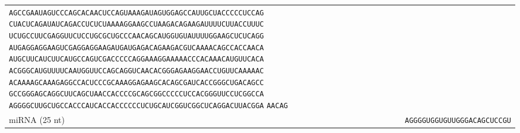 \begin{table}[ht]
\begin{tabular}{@{}p{2.6cm}l@{}}
  \texttt{AGCCGAAUAGUCCCAGCACAACUCCAGUAAAGAUAGUGGAGCCAUUGCUACCCCCUCCAG}\newline
  \texttt{CUACUCAGAUAUCAGACCUCUCUAAAAGGAAGCCUAAGACAGAAGAUUUUCUUACCUUUC}\newline
  \texttt{UCUGCCUUCGAGGUUCUCCUGCGCUGCCCAACAGCAUGGUGUAUUUUGGAAGCUCUCAGG}\newline
  \texttt{AUGAGGAGGAAGUCGAGGAGGAAGAUGAUGAGACAGAAGACGUCAAAACAGCCACCAACA}\newline
  \texttt{AUGCUUCAUCUUCAUGCCAGUCGACCCCCAGGAAAGGAAAAACCCACAAACAUGUUCACA}\newline
  \texttt{ACGGGCAUGUUUUCAAUGGUUCCAGCAGGUCAACACGGGAGAAGGAACCUGUUCAAAAAC}\newline
  \texttt{ACAAAAGCAAAGAGGCCACUCCCGCAAAGGAGAAGCACAGCGAUCACCGGGCUGACAGCC}\newline
  \texttt{GCCGGGAGCAGGCUUCAGCUAACCACCCCGCAGCGGCCCCCUCCACGGGUUCCUCGGCCA}\newline
  \texttt{AGGGGCUUGCUGCCACCCAUCACCACCCCCCUCUGCAUCGGUCGGCUCAGGACUUACGGA}\newline
  \texttt{AACAG} \\[2pt]
miRNA (25 nt) & \texttt{AGGGGUGGUGUUGGGACAGCUCCGU} \\
\bottomrule
\end{tabular}
\end{table}
